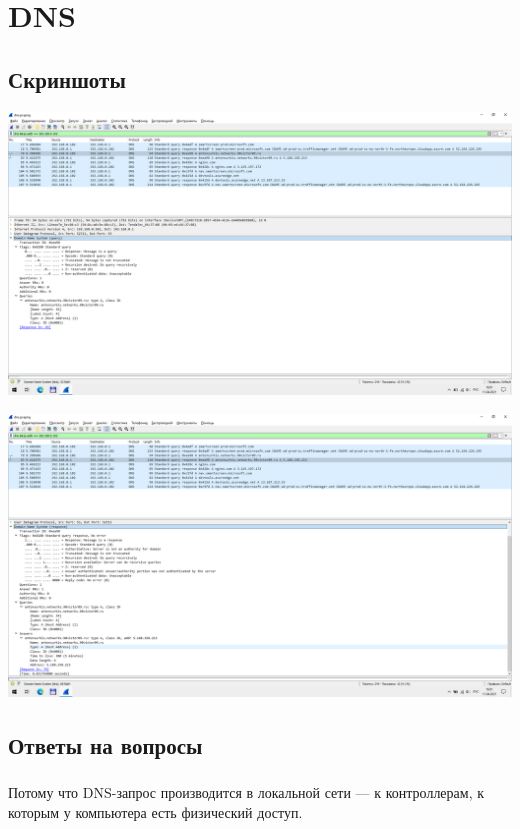 
\section{DNS}

\subsection{Скриншоты}

\begin{center}

    \includegraphics[width=\textwidth]{screenshots/dns_request_1}

    \includegraphics[width=\textwidth]{screenshots/dns_response_1}

\end{center}

\subsection{Ответы на вопросы}

\subsubsection{}
Потому что DNS-запрос производится в локальной сети --- к контроллерам, к которым у компьютера есть физический доступ.


